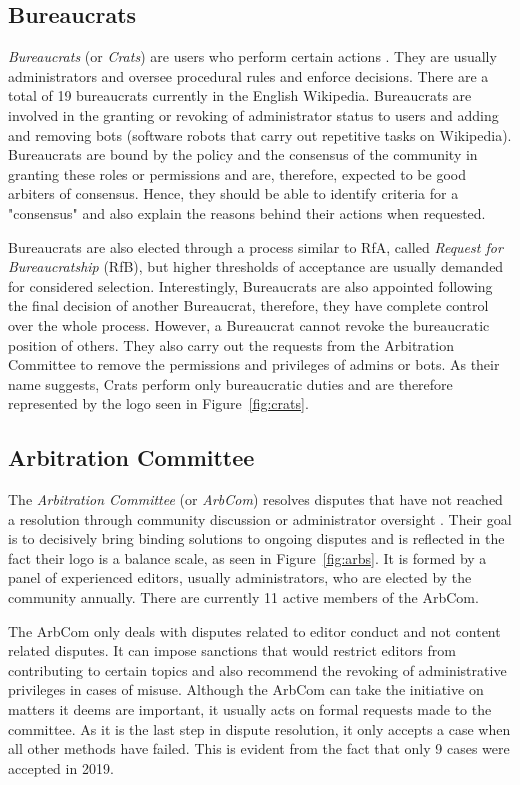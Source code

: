 \subsection{Bureaucrats}
\textit{Bureaucrats} (or \textit{Crats}) are users who perform certain actions \cite{wiki:bureaucrats}.
They are usually administrators and oversee procedural rules and enforce decisions.
There are a total of 19 bureaucrats currently in the English Wikipedia.
Bureaucrats are involved in the granting or revoking of administrator status to users and adding and removing bots (software robots that carry out repetitive tasks on Wikipedia).
Bureaucrats are bound by the policy and the consensus of the community in granting these roles or permissions and are, therefore, expected to be good arbiters of consensus.
Hence, they should be able to identify criteria for a "consensus" and also explain the reasons behind their actions when requested. 

Bureaucrats are also elected through a process similar to RfA, called \textit{Request for Bureaucratship} (RfB), but higher thresholds of acceptance are usually demanded for considered selection.
Interestingly, Bureaucrats are also appointed following the final decision of another Bureaucrat, therefore, they have complete control over the whole process.
However, a Bureaucrat cannot revoke the bureaucratic position of others.
They also carry out the requests from the Arbitration Committee to remove the permissions and privileges of admins or bots.
As their name suggests, Crats perform only bureaucratic duties and are therefore represented by the logo seen in Figure~\ref{fig:crats}.

\subsection{Arbitration Committee}
The \textit{Arbitration Committee} (or \textit{ArbCom}) resolves disputes that have not reached a resolution through community discussion or administrator oversight \cite{wiki:arbcom}.
Their goal is to decisively bring binding solutions to ongoing disputes and is reflected in the fact their logo is a balance scale, as seen in Figure~\ref{fig:arbs}.
It is formed by a panel of experienced editors, usually administrators, who are elected by the community annually.
There are currently 11 active members of the ArbCom.

The ArbCom only deals with disputes related to editor conduct and not content related disputes.
It can impose sanctions that would restrict editors from contributing to certain topics and also recommend the revoking of administrative privileges in cases of misuse.
Although the ArbCom can take the initiative on matters it deems are important, it usually acts on formal requests made to the committee.
As it is the last step in dispute resolution, it only accepts a case when all other methods have failed.
This is evident from the fact that only 9 cases were accepted in 2019. 

